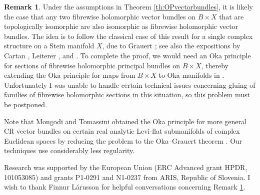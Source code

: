 \documentclass[11pt]{amsart}
\numberwithin{equation}{section}
\theoremstyle{definition}
\newtheorem{remark}[theorem]{Remark}
\begin{document}
%
%
\begin{remark}\label{rem:OPvectorbundles}
Under the assumptions in Theorem \ref{th:OPvectorbundles},
it is likely the case that any two fibrewise holomorphic vector bundles on 
$B\times X$ that are topologically isomorphic are also isomorphic 
as fibrewise holomorphic vector bundles.
The idea is to follow the classical case of this result for a single
complex structure on a Stein manifold $X$, due to Grauert
\cite{Grauert1958MA}; see also the expositions 
by Cartan \cite{Cartan1958}, Leiterer \cite{Leiterer1990}, and 
\cite[Theorem 5.3.1]{Forstneric2017E}. 
To complete the proof, we would need an Oka principle 
for sections of fibrewise holomorphic principal bundles
on $B\times X$, thereby extending the Oka principle
for maps from $B\times X$ to Oka manifolds
in \cite[Theorem 1.6]{Forstneric2024Runge}.
Unfortunately I was unable to handle certain technical 
issues concerning gluing of families of fibrewise holomorphic 
sections in this situation, so this problem must be postponed.

Note that Mongodi and Tomassini \cite{MongodiTomassini2019}  
obtained the Oka principle for more general CR vector bundles 
on certain real analytic Levi-flat submanifolds of complex 
Euclidean spaces by reducing the problem to the 
Oka--Grauert theorem \cite{Grauert1958MA}.
Our techniques use considerably less regularity.
\end{remark}

% 
% 
% 
% 
\medskip 
{} 
Research was supported by the European Union 
(ERC Advanced grant HPDR, 101053085) and grants P1-0291 and 
N1-0237 from ARIS, Republic of Slovenia. 
I wish to thank Finnur L\'arusson for helpful conversations concerning 
Remark \ref{rem:OPvectorbundles}.



\end{document}
